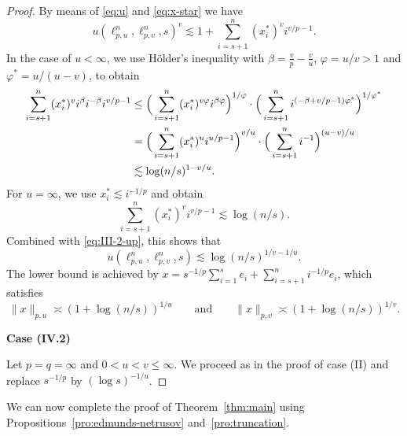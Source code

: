 \documentclass[a4paper,12pt]{article}
\theoremstyle{definition}
\begin{document}
\begin{proof}
By means of \eqref{eq:u} and \eqref{eq:x-star} we have
\begin{equation} \label{eq:III-2-up}
u(\ell_{p,u}^{n},\ell_{p,v}^n,s)^v
\lesssim 1+\sum_{i=s+1}^{n}(x_i^*)^v i^{v/p-1}.
\end{equation}
In the case of $u<\infty$, we use Hölder's inequality with $\beta=\frac{v}{p}-\frac{v}{u}$, $\varphi=u/v>1$ and $\varphi^*=u/(u-v)$, to obtain
\begin{align}
\notag\sum_{i=s+1}^{n}(x_i^*)^v i^{\beta} i^{-\beta}i^{v/p-1}
&\le
\Big(\sum_{i=s+1}^{n}(x_i^*)^{v\varphi}i^{\beta \varphi}\Big)^{1/\varphi}\cdot
\Big(\sum_{i=s+1}^{n}i^{(-\beta+v/p-1) \varphi^*}\Big)^{1/\varphi^*}\\
\label{eq:III.2}&= \Big(\sum_{i=s+1}^{n}(x_i^*)^{u}i^{u/p-1}\Big)^{v/u}
\cdot \Big(\sum_{i=s+1}^{n}i^{-1}\Big)^{(u-v)/u}\\
\notag&\lesssim \log(n/s)^{1-v/u}.
\end{align}
For $u=\infty$, we use $x_i^*\lesssim i^{-1/p}$ and obtain 
\[
\sum_{i=s+1}^{n}(x_i^*)^v i^{v/p-1}\lesssim \log(n/s).
\]
Combined with \eqref{eq:III-2-up}, this shows that 
\[
u(\ell_{p,u}^{n},\ell_{p,v}^n,s)\lesssim \log(n/s)^{1/v-1/u}.
\]
The lower bound is achieved by $x=s^{-1/p}\sum_{i=1}^{s}e_i+\sum_{i=s+1}^{n}i^{-1/p}e_i$, which satisfies 
\[
\|x\|_{p,u}
\asymp (1+ \log(n/s))^{1/u}\qquad \text{and}\qquad \|x\|_{p,v}\asymp (1+ \log(n/s))^{1/v}.
\]

\noindent \textbf{Case (IV.2)} 

Let $p=q=\infty$ and $0<u<v\le \infty$. We proceed as in the proof of case (II) and replace $s^{-1/p}$ by $(\log s)^{-1/u}$.

\end{proof}

We can now complete the proof of Theorem~\ref{thm:main} using Propositions~\ref{pro:edmunds-netrusov} and~\ref{pro:truncation}.
\end{document}

